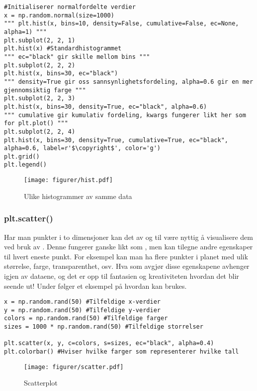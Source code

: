 \documentclass[a4paper,12pt]{article}
\begin{document}
\begin{lstlisting}
#Initialiserer normalfordelte verdier
x = np.random.normal(size=1000) 
""" plt.hist(x, bins=10, density=False, cumulative=False, ec=None, alpha=1) """
plt.subplot(2, 2, 1)
plt.hist(x) #Standardhistogrammet
""" ec="black" gir skille mellom bins """
plt.subplot(2, 2, 2)
plt.hist(x, bins=30, ec="black")
""" density=True gir oss sannsynlighetsfordeling, alpha=0.6 gir en mer gjennomsiktig farge """
plt.subplot(2, 2, 3)
plt.hist(x, bins=30, density=True, ec="black", alpha=0.6)
""" cumulative gir kumulativ fordeling, kwargs fungerer likt her som for plt.plot() """
plt.subplot(2, 2, 4)
plt.hist(x, bins=30, density=True, cumulative=True, ec="black", alpha=0.6, label=r'$\copyright$', color='g')
plt.grid()
plt.legend()
\end{lstlisting}

\begin{figure}[ht]
    \centering
    \texttt{[image: figurer/hist.pdf]}
    \caption{Ulike histogrammer av samme data}
    \label{fig:hist.pdf}
\end{figure}

\subsubsection{plt.scatter()}
Har man punkter i to dimensjoner kan det av og til være nyttig å visualisere dem ved bruk av . Denne fungerer ganske likt som , men kan tilegne andre egenskaper til hvert eneste punkt. For eksempel kan man ha flere punkter i planet med ulik størrelse, farge, transparenthet, osv. Hva som avgjør disse egenskapene avhenger igjen av dataene, og det er opp til fantasien og kreativiteten hvordan det blir seende ut! Under følger et eksempel på hvordan  kan brukes.

\begin{lstlisting}
x = np.random.rand(50) #Tilfeldige x-verdier
y = np.random.rand(50) #Tilfeldige y-verdier
colors = np.random.rand(50) #Tilfeldige farger
sizes = 1000 * np.random.rand(50) #Tilfeldige storrelser

plt.scatter(x, y, c=colors, s=sizes, ec="black", alpha=0.4)
plt.colorbar() #Hviser hvilke farger som representerer hvilke tall
\end{lstlisting}

\begin{figure}[ht]
    \centering
    \texttt{[image: figurer/scatter.pdf]}
    \caption{Scatterplot}
    \label{fig:scatter.pdf}
\end{figure}
\end{document}

